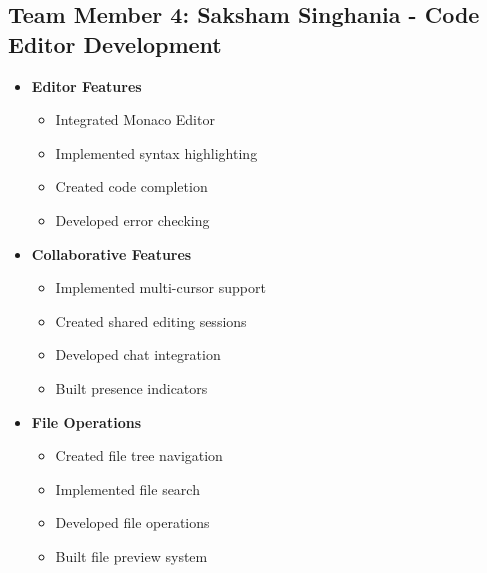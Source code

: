 \documentclass[12pt,a4paper]{report}
\begin{document}
\subsection{Team Member 4: Saksham Singhania - Code Editor Development}
\begin{itemize}
    \item \textbf{Editor Features}
    \begin{itemize}
        \item Integrated Monaco Editor
        \item Implemented syntax highlighting
        \item Created code completion
        \item Developed error checking
    \end{itemize}
    
    \item \textbf{Collaborative Features}
    \begin{itemize}
        \item Implemented multi-cursor support
        \item Created shared editing sessions
        \item Developed chat integration
        \item Built presence indicators
    \end{itemize}
    
    \item \textbf{File Operations}
    \begin{itemize}
        \item Created file tree navigation
        \item Implemented file search
        \item Developed file operations
        \item Built file preview system
    \end{itemize}
\end{itemize}
\end{document}
